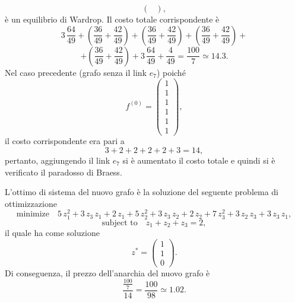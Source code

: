 \begin{alphaparts}
\[\begin{pmatrix}
    \end{pmatrix}, \]
    è un equilibrio di Wardrop.
    Il costo totale corrispondente è
    \[3\,\frac{64}{49} + \left(\frac{36}{49} + \frac{42}{49} \right) + \left( \frac{36}{49} + \frac{42}{49} \right) + \left( \frac{36}{49} + \frac{42}{49} \right) + \]
    \[ + \left( \frac{36}{49} + \frac{42}{49} \right) + 3\,\frac{64}{49} + \frac{4}{49} = \frac{100}{7} \simeq 14.3. \]
    Nel caso precedente (grafo senza il link \(e_7\)) poiché
     \[ f^{(0)} = \begin{pmatrix}
        1 \\ 1 \\ 1 \\ 1 \\ 1 \\ 1
    \end{pmatrix},\]
    il costo corrispondente era pari a 
    \[ 3 + 2 + 2 + 2 + 2 + 3 = 14, \]
    pertanto, aggiungendo il link \(e_7\) si è aumentato il costo totale e quindi si è verificato il paradosso di Braess.
    
    L'ottimo di sistema del nuovo grafo è la soluzione del seguente problema di ottimizzazione
    \[ \text{minimize} \quad 5\,z_1^2 + 3\,z_3\,z_1 + 2\,z_1 + 5\,z_2^2 + 3\,z_3\,z_2 + 2\,z_2 + 7\,z_3^2 + 3\,z_2\,z_3 + 3\,z_3\,z_1,\]
    \[ \text{subject to} \quad z_1 + z_2 + z_3 = 2,\]
    il quale ha come soluzione
     \[ z^{*} = \begin{pmatrix}
        1 \\ 1 \\ 0
    \end{pmatrix}.\]
    Di conseguenza, il prezzo dell'anarchia del nuovo grafo è
    \[ \frac{\frac{100}{7}}{14} = \frac{100}{98} \simeq 1.02.\]
    


\end{alphaparts}
